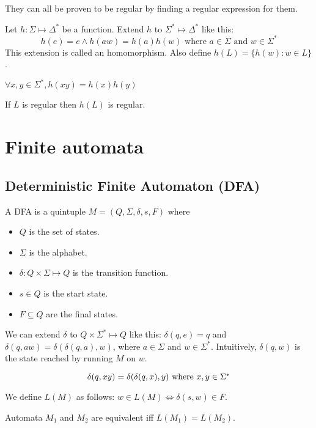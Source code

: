 They can all be proven to be regular by finding a regular expression for them.

Let $h: \Sigma \mapsto \Delta^*$ be a function.
Extend $h$ to $\Sigma^* \mapsto \Delta^*$ like this:
\[ h(e) = e \wedge h(aw) = h(a)h(w) \textrm{ where } a \in \Sigma \textrm{ and } w \in \Sigma^* \]
This extension is called an homomorphism. Also define $h(L) = \{h(w): w \in L\}$.

\begin{theorem}$\forall x, y \in \Sigma^*, h(xy) = h(x)h(y)$\end{theorem}
\begin{theorem}If $L$ is regular then $h(L)$ is regular.\end{theorem}

\section{Finite automata}

\subsection[DFA]{Deterministic Finite Automaton (DFA)}

A DFA is a quintuple $M = (Q, \Sigma, \delta, s, F)$ where

\begin{itemize}
\item $Q$ is the set of states.
\item $\Sigma$ is the alphabet.
\item $\delta: Q \times \Sigma \mapsto Q$ is the transition function.
\item $s \in Q$ is the start state.
\item $F \subseteq Q$ are the final states.
\end{itemize}

We can extend $\delta$ to $Q \times \Sigma^* \mapsto Q$ like this:
$\delta(q, e) = q$ and $\delta(q, aw) = \delta(\delta(q, a), w)$,
where $a \in \Sigma$ and $w \in \Sigma^*$.
Intuitively, $\delta(q, w)$ is the state reached by running $M$ on $w$.

\begin{theorem}
\[ \delta(q, xy) = \delta(\delta(q, x), y)$ where $x, y \in \Sigma^* \]
\end{theorem}

We define $L(M)$ as follows:
$ w \in L(M) \iff \delta(s, w) \in F$.

Automata $M_1$ and $M_2$ are equivalent iff $L(M_1) = L(M_2)$.

